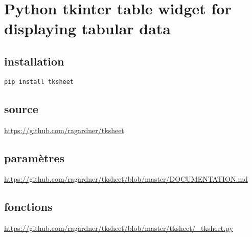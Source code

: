 \documentclass[11pt]{article}
\begin{document}
\section{Python tkinter table widget for displaying tabular data}
\label{sec:org3156c6b}

\subsection{installation}
\label{sec:orgcbccb8e}
\begin{verbatim}
pip install tksheet
\end{verbatim}

\subsection{source}
\label{sec:orgfb5091e}
\url{https://github.com/ragardner/tksheet}

\subsection{paramètres}
\label{sec:org5a18226}
\url{https://github.com/ragardner/tksheet/blob/master/DOCUMENTATION.md}

\subsection{fonctions}
\label{sec:org066bf5f}
\url{https://github.com/ragardner/tksheet/blob/master/tksheet/\_tksheet.py}
\end{document}
